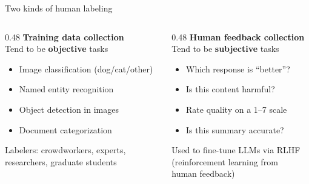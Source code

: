 \documentclass[aspectratio=169,11pt]{beamer}
\begin{document}
\begin{frame}{Two kinds of human labeling}

\begin{columns}[T]
\begin{column}{0.48\textwidth}
\textbf{Training data collection}\\[0.5em]
Tend to be \textbf{objective} tasks\\[0.3em]
\small
\begin{itemize}
  \item Image classification (dog/cat/other)
  \item Named entity recognition
  \item Object detection in images
  \item Document categorization
\end{itemize}
\vspace{0.5em}
\normalsize
Labelers: crowdworkers, experts,\\
researchers, graduate students
\end{column}

\begin{column}{0.48\textwidth}
\textbf{Human feedback collection}\\[0.5em]
Tend to be \textbf{subjective} tasks\\[0.3em]
\small
\begin{itemize}
  \item Which response is ``better''?
  \item Is this content harmful?
  \item Rate quality on a 1--7 scale
  \item Is this summary accurate?
\end{itemize}
\vspace{0.5em}
\normalsize
Used to fine-tune LLMs via RLHF\\
(reinforcement learning from\\
human feedback)
\end{column}
\end{columns}
\end{frame}
\end{document}
